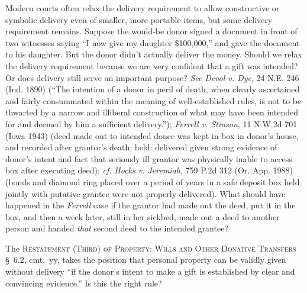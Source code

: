 \item Modern courts often relax the delivery requirement to allow constructive
or symbolic delivery even of smaller, more portable items, but some delivery
requirement remains.  Suppose the would-be donor signed a document in front of
two witnesses saying ``I now give my daughter \$100,000,'' and gave the
document to his daughter.  But the donor didn't actually deliver the money. 
Should we relax the delivery requirement because we are very confident that a
gift was intended?  Or does delivery still serve an important purpose?
\emph{See} \emph{Devol v. Dye}, 24 N.E. 246 (Ind. 1890) (``The intention of a
donor in peril of
death, when clearly ascertained and fairly consummated within the meaning of
well-established rules, is not to be thwarted by a narrow and illiberal
construction of what may have been intended for and deemed by him a sufficient
delivery.''); \emph{Ferrell v. Stinson}, 11 N.W.2d 701 (Iowa 1943) (deed made
out to
intended donee was kept in box in donor's house, and recorded after grantor's
death; held: delivered given strong evidence of donor's intent and fact that
seriously ill grantor was physically inable to access box after executing
deed); \textit{cf.} \emph{Hocks v. Jeremiah}, 759 P.2d 312 (Or. App. 1988)
(bonds and
diamond ring placed over a period of years in a safe deposit box held jointly
with putative grantee were not properly delivered).  What should have happened
in the \textit{Ferrell} case if the grantor had made out the deed, put it in
the box, and then a week later, still in her sickbed, made out a deed to
another person and handed \textit{that} second deed to the intended grantee?  


\item The \textsc{Restatement (Third) of Property: Wills and Other Donative
Transfers}
\S~6.2, cmt.~yy, takes the position that personal property can be validly
given without delivery ``if the donor's intent to make a gift is established by
clear and convincing evidence.''  Is this the right rule?

